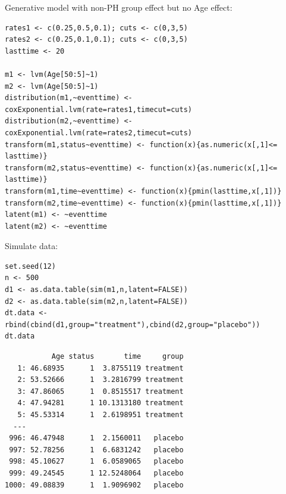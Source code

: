 \documentclass{article}
\begin{document}
Generative model with non-PH group effect but no Age effect:
\lstset{language=r,label= ,caption= ,captionpos=b,numbers=none}
\begin{lstlisting}
rates1 <- c(0.25,0.5,0.1); cuts <- c(0,3,5)
rates2 <- c(0.25,0.1,0.1); cuts <- c(0,3,5)
lasttime <- 20

m1 <- lvm(Age[50:5]~1)
m2 <- lvm(Age[50:5]~1)
distribution(m1,~eventtime) <- coxExponential.lvm(rate=rates1,timecut=cuts)
distribution(m2,~eventtime) <- coxExponential.lvm(rate=rates2,timecut=cuts)
transform(m1,status~eventtime) <- function(x){as.numeric(x[,1]<= lasttime)}
transform(m2,status~eventtime) <- function(x){as.numeric(x[,1]<= lasttime)}
transform(m1,time~eventtime) <- function(x){pmin(lasttime,x[,1])}
transform(m2,time~eventtime) <- function(x){pmin(lasttime,x[,1])}
latent(m1) <- ~eventtime
latent(m2) <- ~eventtime
\end{lstlisting}

Simulate data:
\lstset{language=r,label= ,caption= ,captionpos=b,numbers=none}
\begin{lstlisting}
set.seed(12)
n <- 500
d1 <- as.data.table(sim(m1,n,latent=FALSE))
d2 <- as.data.table(sim(m2,n,latent=FALSE))
dt.data <- rbind(cbind(d1,group="treatment"),cbind(d2,group="placebo"))
dt.data
\end{lstlisting}

\begin{verbatim}
           Age status       time     group
   1: 46.68935      1  3.8755119 treatment
   2: 53.52666      1  3.2816799 treatment
   3: 47.86065      1  0.8515517 treatment
   4: 47.94281      1 10.1313180 treatment
   5: 45.53314      1  2.6198951 treatment
  ---                                     
 996: 46.47948      1  2.1560011   placebo
 997: 52.78256      1  6.6831242   placebo
 998: 45.10627      1  6.0589065   placebo
 999: 49.24545      1 12.5248064   placebo
1000: 49.08839      1  1.9096902   placebo
\end{verbatim}
\end{document}
